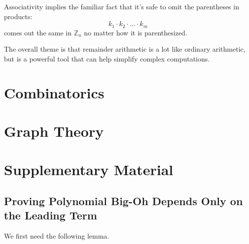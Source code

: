 \documentclass[11pt,oneside]{book}
\theoremstyle{definition}
\begin{document}
Associativity implies the familiar fact that it's safe to omit the parentheses in products:
\[ k_{1} \cdot k_{2} \cdot \ldots \cdot k_{m} \]
comes out the same in $\mathbb{Z}_{n}$ no matter how it is parenthesized.

The overall theme is that remainder arithmetic is a lot like ordinary arithmetic, but is a powerful tool that can help simplify complex computations.



\chapter{Combinatorics}




\chapter{Graph Theory}



\appendix
\chapter{Supplementary Material}
\section{Proving Polynomial Big-Oh Depends Only on the Leading Term} \label{appendix:PolynomialBig-Oh}
We first need the following lemma.
\end{document}
